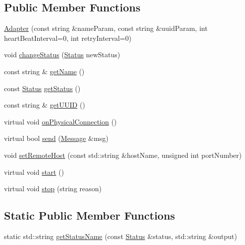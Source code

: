 \subsection*{Public Member Functions}
\begin{DoxyCompactItemize}
\item 
\hyperlink{classMetal_1_1Adapter_a828179536cd26810f7e8b5974f9b5d59}{Adapter} (const string \&name\+Param, const string \&uuid\+Param, int heart\+Beat\+Interval=0, int retry\+Interval=0)
\item 
void \hyperlink{classMetal_1_1Adapter_a56933c0ff40eefd301f8c7e3dce3bd2d}{change\+Status} (\hyperlink{classMetal_1_1Adapter_a61c44194e1ca48fb73a122997c5c7f27}{Status} new\+Status)
\item 
const string \& \hyperlink{classMetal_1_1Adapter_a5f1e1794f66b7ee2baa83fa0ced358f9}{get\+Name} ()
\item 
const \hyperlink{classMetal_1_1Adapter_a61c44194e1ca48fb73a122997c5c7f27}{Status} \hyperlink{classMetal_1_1Adapter_ae78f5196b54e66eda97f5cdf30bb4054}{get\+Status} ()
\item 
const string \& \hyperlink{classMetal_1_1Adapter_a8afe15d61b6a463cf8de59fca1edb4ab}{get\+U\+U\+I\+D} ()
\item 
virtual void \hyperlink{classMetal_1_1Adapter_a1b3f9988b655d117839ed0d1596bd874}{on\+Physical\+Connection} ()
\item 
virtual bool \hyperlink{classMetal_1_1Adapter_ac2e4e326e38e09a0cdb99cd115631935}{send} (\hyperlink{classMetal_1_1Message}{Message} \&msg)
\item 
void \hyperlink{classMetal_1_1Adapter_ace438124a6a9016dd5c16f8da6d8e34b}{set\+Remote\+Host} (const std\+::string \&host\+Name, unsigned int port\+Number)
\item 
virtual void \hyperlink{classMetal_1_1Adapter_adeed43dfa9e2d18bd66dd2f806b1e182}{start} ()
\item 
virtual void \hyperlink{classMetal_1_1Adapter_a61dfa08ff92a37a9344bbe8f6c385d8a}{stop} (string reason)
\end{DoxyCompactItemize}
\subsection*{Static Public Member Functions}
\begin{DoxyCompactItemize}
\item 
static std\+::string \hyperlink{classMetal_1_1Adapter_a3bfecebf45be6afa8aa59ed0b2fd9f23}{get\+Status\+Name} (const \hyperlink{classMetal_1_1Adapter_a61c44194e1ca48fb73a122997c5c7f27}{Status} \&status, std\+::string \&output)
\end{DoxyCompactItemize}
